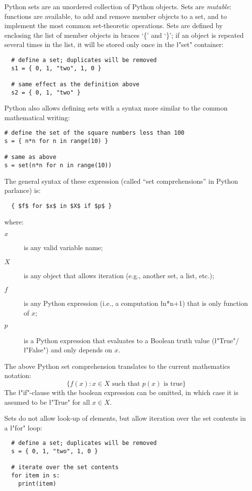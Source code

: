 Python sets are an unordered collection of Python objects.  Sets are
\emph{mutable}: functions are available, to add and remove member objects to
a set, and to implement the most common set-theoretic operations.
Sets are defined by enclosing the list of member objects in braces
`\{' and `\}'; if an object is repeated several times in the list,
it will be stored only once in the \l"set" container:
\begin{lstlisting}
  # define a set; duplicates will be removed
  s1 = { 0, 1, "two", 1, 0 }

  # same effect as the definition above
  s2 = { 0, 1, "two" }
\end{lstlisting}
Python also allows defining sets with a syntax more similar to the
common mathematical writing:
\begin{lstlisting}
# define the set of the square numbers less than 100
s = { n*n for n in range(10) }

# same as above
s = set(n*n for n in range(10))
\end{lstlisting}
The general syntax of these expression (called ``set comprehensions''
in Python parlance) is:
\begin{lstlisting}
  { $f$ for $x$ in $X$ if $p$ }
\end{lstlisting}
where:
\begin{description}
\item[$x$] is any valid variable name;
\item[$X$] is any object that allows iteration (e.g., another
  set, a list, etc.);
\item[$f$] is any Python expression (i.e., a computation \l{n*n+1}) 
  that is only function of $x$;
\item[$p$] is a Python expression that evaluates to a
  Boolean truth value (\l"True"/\l"False") and only depends on $x$.
\end{description}
The above Python set comprehension translates to the current
mathematics notation:
\begin{equation*}
  \{ f(x) : x \in X \text{ such that } p(x) \text{ is true} \}
\end{equation*}
The \l"if"-clause with the boolean expression can be omitted, in which
case it is assumed to be \l"True" for all $x \in X$.

Sets do not allow look-up of elements, but allow iteration over the set
contents in a \l"for" loop:
\begin{lstlisting}
  # define a set; duplicates will be removed
  s = { 0, 1, "two", 1, 0 }

  # iterate over the set contents
  for item in s:
    print(item)
\end{lstlisting}

